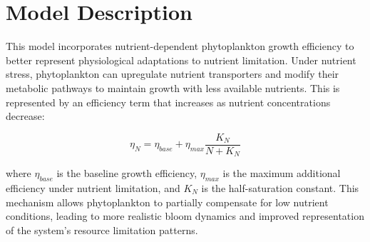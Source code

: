 \section{Model Description}

This model incorporates nutrient-dependent phytoplankton growth efficiency to better represent physiological adaptations to nutrient limitation. Under nutrient stress, phytoplankton can upregulate nutrient transporters and modify their metabolic pathways to maintain growth with less available nutrients. This is represented by an efficiency term that increases as nutrient concentrations decrease:

\[ \eta_N = \eta_{base} + \eta_{max} \frac{K_N}{N + K_N} \]

where $\eta_{base}$ is the baseline growth efficiency, $\eta_{max}$ is the maximum additional efficiency under nutrient limitation, and $K_N$ is the half-saturation constant. This mechanism allows phytoplankton to partially compensate for low nutrient conditions, leading to more realistic bloom dynamics and improved representation of the system's resource limitation patterns.
